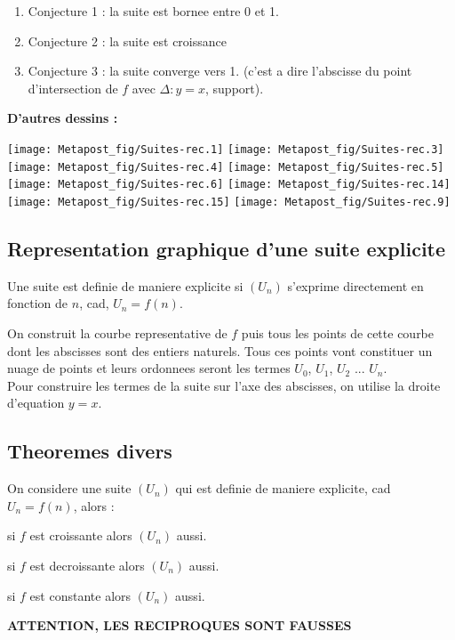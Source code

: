 \documentclass[a4paper,10pt]{book}
\begin{document}
			\begin{enumerate}
				\item Conjecture 1 : la suite est bornee entre 0 et 1.
				\item Conjecture 2 : la suite est croissance
				\item Conjecture 3 : la suite converge vers 1. (c'est a dire l'abscisse du point d'intersection de $f$ avec $\Delta : y = x$, support).
			\end{enumerate}
			\newpage
			\textbf{D'autres dessins :}
			\begin{center}
					\texttt{[image: Metapost\_fig/Suites-rec.1]}
					\texttt{[image: Metapost\_fig/Suites-rec.3]}
					\texttt{[image: Metapost\_fig/Suites-rec.4]}
					\texttt{[image: Metapost\_fig/Suites-rec.5]}
					\texttt{[image: Metapost\_fig/Suites-rec.6]}
					\texttt{[image: Metapost\_fig/Suites-rec.14]}
					\texttt{[image: Metapost\_fig/Suites-rec.15]}
					\texttt{[image: Metapost\_fig/Suites-rec.9]}
			\end{center}

			\newpage

			\subsection{Representation graphique d'une suite explicite}

			\begin{Def}
				Une suite est definie de maniere explicite si $(U_n)$ s'exprime directement en fonction de $n$, cad, $U_n = f(n)$.
			\end{Def}

			On construit la courbe representative de $f$ puis tous les points de cette courbe dont les abscisses sont des entiers naturels. Tous ces points vont constituer un nuage de points et leurs ordonnees seront les termes $U_0$, $U_1$, $U_2$ ... $U_n$.\\
			Pour construire les termes de la suite sur l'axe des abscisses, on utilise la droite d'equation $y = x$.

			\subsection{Theoremes divers}

			\begin{prop}
				On considere une suite $(U_n)$ qui est definie de maniere explicite, cad $U_n = f(n)$, alors :
				\begin{description}
					\item si $f$ est croissante alors $(U_n)$ aussi.
					\item si $f$ est decroissante alors $(U_n)$ aussi.
					\item si $f$ est constante alors $(U_n)$ aussi.
				\end{description}
			\end{prop}
			\textbf{ATTENTION, LES RECIPROQUES SONT FAUSSES}
\end{document}
